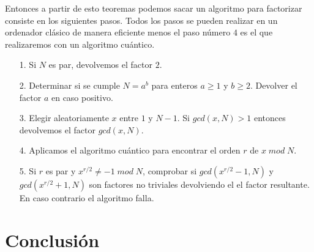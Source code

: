 \documentclass[a4paper]{article}
\numberwithin{equation}{section}
\newcommand{\modd}{\; mod \;}
\begin{document}
Entonces a partir de esto teoremas podemos sacar un algoritmo para factorizar consiste en los siguientes pasos. Todos los pasos se pueden realizar en un ordenador clásico de manera eficiente menos el paso número $4$ es el que realizaremos con un algoritmo cuántico.
\begin{itemize}
\item[1.]Si $N$ es par, devolvemos el factor $2$.

\item[2.]Determinar si se cumple $N = a^b$ para enteros $a\geq 1$ y $b \geq 2$. Devolver el factor $a$ en caso positivo.

\item[3.]Elegir aleatoriamente $x$ entre $1$ y $N-1$. Si $gcd(x,N)>1$ entonces devolvemos el factor $gcd(x,N)$.

\item[4.]Aplicamos el algoritmo cuántico para encontrar el orden $r$ de $x \modd N$.

\item[5.]Si $r$ es par y $x^{r/2}\neq -1 \modd N$, comprobar si $gcd(x^{r/2}-1, N)$ y $gcd(x^{r/2}+1, N)$ son factores no triviales devolviendo el el factor resultante. En caso contrario el algoritmo falla.
\end{itemize}

\newpage

\section{Conclusión}
\end{document}
